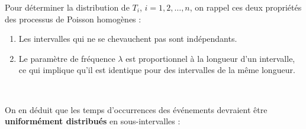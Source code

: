 \documentclass[10pt, french]{article}
\begin{document}
\begin{multicols*}{2}
Pour déterminer la distribution de $T_{i}$, $i	=	1, 2, \dots, n$, on rappel ces deux propriétés des processus de Poisson homogènes :
\begin{enumerate}[label	=	\circled{\arabic*}{trueblue}]
	\item	Les intervalles qui ne se chevauchent pas sont indépendants.
	\item	Le paramètre de fréquence $\lambda$ est proportionnel à la longueur d'un intervalle, ce qui implique qu'il est identique pour des intervalles de la même longueur.
\end{enumerate}

\

On en déduit que les temps d'occurrences des événements devraient être \textbf{\textcolor{armygreen}{uniformément} distribués} en  sous-intervalles : 
\begin{center}
\begin{tikzpicture}[x=0.75pt,y=0.75pt,yscale=-1,xscale=1]


\end{tikzpicture}
\end{center}
\end{multicols*}
\end{document}
